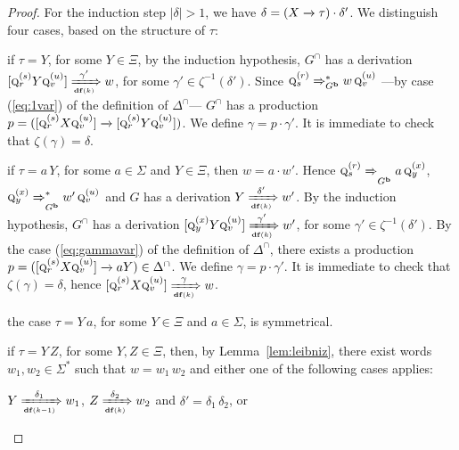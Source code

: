 \documentclass[final]{llncs}
\newcommand{\arrow}[2]{\xrightarrow{{\scriptscriptstyle #1}}}
\def\len#1{{\vert{#1}\vert}}
\def\pat{{\mathbf{b}}}
\def\df#1{\scriptscriptstyle\mathbf{df}(#1)}
\def\Vars{\ensuremath{\Xi}}
\begin{document}
\begin{proof}
For the induction step $\len{\delta} > 1$, we have $\delta = (X
\arrow{}{} \tau) \cdot \delta'$. We distinguish four cases, based on
the structure of $\tau$:
\begin{compactenum}
\item if $\tau = Y$, for some $Y \in \Vars$, by the induction
  hypothesis, $G^\cap$ has a derivation $[\textsc{q}^{(s)}_r Y
    \textsc{q}_{v}^{(u)}] \xRightarrow[\df{k}]{\gamma'} w$, for some
  $\gamma' \in \zeta^{-1}(\delta')$. Since
  $\textsc{q}_{s}^{(r)}\Rightarrow_{G^{\pat}}^* w\,\textsc{q}_{v}^{(u)}$  ---by case (\ref{eq:1var}) of the definition of $\Delta^\cap$---  $G^\cap$ has a production $p = ([\textsc{q}^{(s)}_r X
    \textsc{q}_{v}^{(u)}] \arrow{}{} [\textsc{q}^{(s)}_r Y
    \textsc{q}_{v}^{(u)}])$. We define $\gamma = p \cdot \gamma'$. It
  is immediate to check that $\zeta(\gamma)=\delta$.

\item if $\tau = a\, Y$, for some $a \in \Sigma$ and $Y \in
  \Vars$, then $w = a \cdot w'$. Hence $\textsc{q}_{s}^{(r)}
  \xRightarrow{}_{G^{\pat}} a\, \textsc{q}_{y}^{(x)}$,
  $\textsc{q}_{y}^{(x)} \xRightarrow{}_{G^{\pat}}^* w' \,\textsc{q}_{v}^{(u)}$ and $G$ has a derivation $Y
  \xRightarrow[\df{k}]{\delta'} w'$. By the induction hypothesis,
  $G^\cap$ has a derivation $[\textsc{q}_{y}^{(x)} Y
    \textsc{q}_{v}^{(u)}] \xRightarrow[\df{k}]{\gamma'} w'$, for some
		$\gamma' \in \zeta^{-1}(\delta')$. By the case (\ref{eq:gammavar}) of the
  definition of $\Delta^\cap$, there exists a production $p =
  ([\textsc{q}_{r}^{(s)} X \textsc{q}_{v}^{(u)}] \arrow{}{} a Y)
  \in \Delta^\cap$. We define $\gamma = p \cdot \gamma'$. It is
  immediate to check that $\zeta(\gamma) = \delta$, hence
  $[\textsc{q}_{r}^{(s)} X \textsc{q}_{v}^{(u)}]
  \xRightarrow[\df{k}]{\gamma} w$. 

\item the case $\tau = Y\, a$, for some $Y \in \Vars$ and $a \in
  \Sigma$, is symmetrical.

\item if $\tau = Y\, Z$, for some $Y,Z \in \Vars$, then, by Lemma~\ref{lem:leibniz}, 
      there exist words $w_1, w_2 \in \Sigma^*$ such that $w = w_1\, w_2$
      and either one of the following cases
      applies: 

      \begin{compactenum} 

      \item $Y \xRightarrow[\df{k-1}]{\delta_1} w_1$,
      $Z \xRightarrow[\df{k}]{\delta_2} w_2$ and
      $\delta'=\delta_1\,\delta_2$, or


\end{compactenum}
\end{compactenum}
\end{proof}
\end{document}
